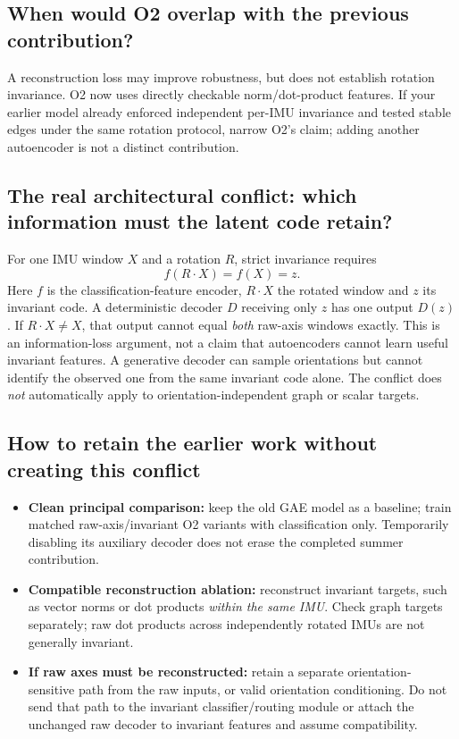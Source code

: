 \documentclass[10pt]{article}
\begin{document}
\subsection*{When would O2 overlap with the previous contribution?}
A reconstruction loss may improve robustness, but does not establish rotation invariance. O2 now uses directly checkable norm/dot-product features. If your earlier model already enforced independent per-IMU invariance and tested stable edges under the same rotation protocol, narrow O2's claim; adding another autoencoder is not a distinct contribution.

\subsection*{The real architectural conflict: which information must the latent code retain?}
For one IMU window $X$ and a rotation $R$, strict invariance requires
\[
f(R\cdot X)=f(X)=z.
\]
Here $f$ is the classification-feature encoder, $R\cdot X$ the rotated window and $z$ its invariant code. A deterministic decoder $D$ receiving only $z$ has one output $D(z)$. If $R\cdot X\neq X$, that output cannot equal \emph{both} raw-axis windows exactly. This is an information-loss argument, not a claim that autoencoders cannot learn useful invariant features. A generative decoder can sample orientations but cannot identify the observed one from the same invariant code alone. The conflict does \emph{not} automatically apply to orientation-independent graph or scalar targets.

\subsection*{How to retain the earlier work without creating this conflict}
\begin{itemize}
\item \textbf{Clean principal comparison:} keep the old GAE model as a baseline; train matched raw-axis/invariant O2 variants with classification only. Temporarily disabling its auxiliary decoder does not erase the completed summer contribution.
\item \textbf{Compatible reconstruction ablation:} reconstruct invariant targets, such as vector norms or dot products \emph{within the same IMU}. Check graph targets separately; raw dot products across independently rotated IMUs are not generally invariant.
\item \textbf{If raw axes must be reconstructed:} retain a separate orientation-sensitive path from the raw inputs, or valid orientation conditioning. Do not send that path to the invariant classifier/routing module or attach the unchanged raw decoder to invariant features and assume compatibility.
\end{itemize}
\end{document}
